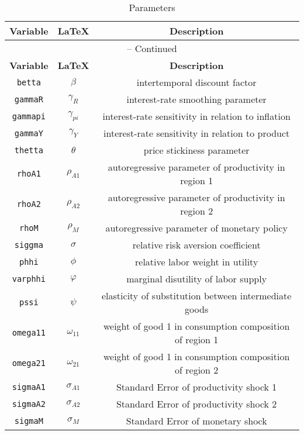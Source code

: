 \begin{center}
\begin{longtable}{ccc}
\caption{Parameters}\\%
\hline%
\multicolumn{1}{c}{\textbf{Variable}} &
\multicolumn{1}{c}{\textbf{\LaTeX}} &
\multicolumn{1}{c}{\textbf{Description}}\\%
\hline\hline%
\endfirsthead
\multicolumn{3}{c}{{\tablename} \thetable{} -- Continued}\\%
\hline%
\multicolumn{1}{c}{\textbf{Variable}} &
\multicolumn{1}{c}{\textbf{\LaTeX}} &
\multicolumn{1}{c}{\textbf{Description}}\\%
\hline\hline%
\endhead
\texttt{betta} & ${\beta}$ & intertemporal discount factor\\
\texttt{gammaR} & ${\gamma_{R}}$ & interest-rate smoothing parameter\\
\texttt{gammapi} & ${\gamma_{pi}}$ & interest-rate sensitivity in relation to inflation\\
\texttt{gammaY} & ${\gamma_{Y}}$ & interest-rate sensitivity in relation to product\\
\texttt{thetta} & ${\theta}$ & price stickiness parameter\\
\texttt{rhoA1} & ${\rho_{A1}}$ & autoregressive parameter of productivity in region 1\\
\texttt{rhoA2} & ${\rho_{A2}}$ & autoregressive parameter of productivity in region 2\\
\texttt{rhoM} & ${\rho_{M}}$ & autoregressive parameter of monetary policy\\
\texttt{siggma} & ${\sigma}$ & relative risk aversion coefficient\\
\texttt{phhi} & ${\phi}$ & relative labor weight in utility\\
\texttt{varphhi} & ${\varphi}$ & marginal disutility of labor supply\\
\texttt{pssi} & ${\psi}$ & elasticity of substitution between intermediate goods\\
\texttt{omega11} & ${\omega_{11}}$ & weight of good 1 in consumption composition of region 1\\
\texttt{omega21} & ${\omega_{21}}$ & weight of good 1 in consumption composition of region 2\\
\texttt{sigmaA1} & ${\sigma_{A1}}$ & Standard Error of productivity shock 1\\
\texttt{sigmaA2} & ${\sigma_{A2}}$ & Standard Error of productivity shock 2\\
\texttt{sigmaM} & ${\sigma_M}$ & Standard Error of monetary shock\\
\hline%
\end{longtable}
\end{center}
